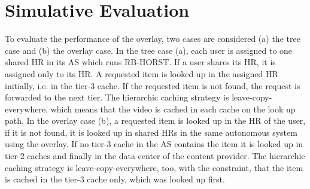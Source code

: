 \section{Simulative Evaluation}

To evaluate the performance of the overlay, two cases are considered (a) the tree case and (b) the overlay case. In the tree case (a), each user is assigned to one shared HR in its AS which runs RB-HORST. If a user shares its HR, it is assigned only to its HR. A requested item is looked up in the assigned HR initially, i.e. in the tier-3 cache. If the requested item is not found, the request is forwarded to the next tier. The hierarchic caching strategy is leave-copy-everywhere, which means that the video is cached in each cache on the look up path. In the overlay case (b), a requested item is looked up in the HR of the user, if it is not found, it is looked up in shared HRs in the same autonomous system using the overlay. If no tier-3 cache in the AS contains the item it is looked up in tier-2 caches and finally in the data center of the content provider. The hierarchic caching strategy is leave-copy-everywhere, too, with the constraint, that the item is cached in the tier-3 cache only, which was looked up first.

